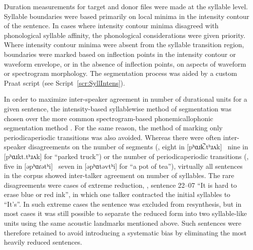 
Duration measurements for target and donor files were made at the syllable level.  Syllable boundaries were based primarily on local minima in the intensity contour of the sentence.  In cases where intensity contour minima disagreed with phonological syllable affinity, the phonological considerations were given priority.\footnotemark{}  Where intensity contour minima were absent from the syllable transition region, boundaries were marked based on inflection points in the intensity contour or waveform envelope, or in the absence of inflection points, on aspects of waveform or spectrogram morphology.  The segmentation process was aided by a custom Praat script (see Script~\ref{scr:SyllIntens}).


In order to maximize inter-speaker agreement in number of durational units for a given sentence, the intensity-based syllablewise method of segmentation was chosen over the more common spectrogram-based phonemic\slsh{}allophonic segmentation method \citep[\eg][]{PetersonLehiste1960, TurkEtAl2006}.  For the same reason, the method of marking only periodic\slsh{}aperiodic transitions \citep[\eg][]{xxx} was also avoided.  Whereas there were often inter-speaker disagreements on the number of segments (\eg, eight in [pʰɑɹk̚.tʰɹʌk] \vs\ nine in [pʰɑɹkt.tʰɹʌk] for “parked truck”) or the number of periodic\slsh{}aperiodic transitions (\eg, five in [əpʰɑɾətʰi] \vs\ seven in [əpʰɑtəvtʰi] for “a pot of tea”), virtually all sentences in the corpus showed inter-talker agreement on number of syllables.  The rare disagreements were cases of extreme reduction, \eg, sentence 22–07 “It is hard to erase blue or red ink”, in which one talker contracted the initial syllables to “It’s”.  In such extreme cases the sentence was excluded from resynthesis, but in most cases it was still possible to separate the reduced form into two syllable-like units using the same acoustic landmarks mentioned above.  Such sentences were therefore retained to avoid introducing a systematic bias by eliminating the most heavily reduced sentences.

